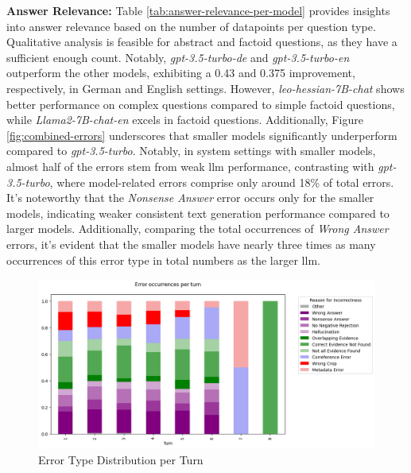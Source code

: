 \noindent\textbf{Answer Relevance:} Table \ref{tab:answer-relevance-per-model} provides insights into answer relevance based on the number of datapoints per question type. Qualitative analysis is feasible for abstract and factoid questions, as they have a sufficient enough count. Notably, \textit{gpt-3.5-turbo-de} and \textit{gpt-3.5-turbo-en} outperform the other models, exhibiting a 0.43 and 0.375 improvement, respectively, in German and English settings. However, \textit{leo-hessian-7B-chat} shows better performance on complex questions compared to simple factoid questions, while \textit{Llama2-7B-chat-en} excels in factoid questions. Additionally, Figure \ref{fig:combined-errors} underscores that smaller models significantly underperform compared to \textit{gpt-3.5-turbo}. Notably, in system settings with smaller models, almost half of the errors stem from weak \gls{llm} performance, contrasting with \textit{gpt-3.5-turbo}, where model-related errors comprise only around 18\% of total errors. It's noteworthy that the \textit{Nonsense Answer} error occurs only for the smaller models, indicating weaker consistent text generation performance compared to larger models. Additionally, comparing the total occurrences of \textit{Wrong Answer} errors, it's evident that the smaller models have nearly three times as many occurrences of this error type in total numbers as the larger \gls{llm}.


\begin{figure}[h]
    \centering
    \includegraphics[width=\textwidth]{Grafiken/Evaluation/EndToEnd/Turns-Errors.png}
    \caption{Error Type Distribution per Turn}
    \label{fig:question-type-turn}
\end{figure}


